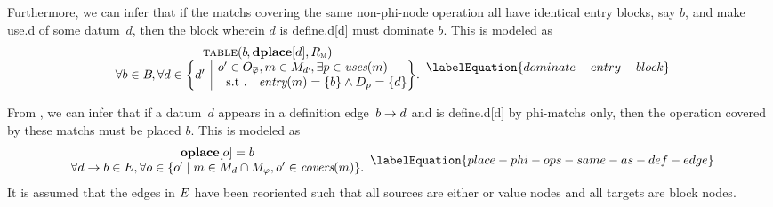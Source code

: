 Furthermore, we can infer that if the \glspl{match} covering the same
non-\gls{phi-node} \gls{operation} all have identical \glspl{entry block}, say
$b$\hspace{-1pt}, and make \gls{use.d} of some \gls{datum}~$d$\hspace{-1pt},
then the \gls{block} wherein $d$ is \gls{define.d}[d] must dominate
$b$\hspace{-1pt}.
%
This is modeled as
%
\begin{equation}
  \begin{array}{c}
    \mTable(b \hspace{-.8pt}, \mVar{dplace}[d], \mDomMatrix) \\
    \forall b \in \mBlockSet \hspace{-1pt},
    \forall d \in
      \mSetBuilder*{d'}%
                   {%
                     \begin{array}{@{}l@{}}
                       o' \in \mOpCompSet{\mPhi},
                       m \in \mMatchSet[d'] \hspace{-1pt},
                       \exists p \in \mUses(m) \\
                       \text{ \st}
                       \mEntry(m) = \mSet{b} \mAnd \mDataSet[p] = \mSet{d}
                     \end{array}
                   } \!.
  \end{array}
  \labelEquation{dominate-entry-block}
\end{equation}

From , we can infer that if a \gls{datum}~$d$ appears in
a \gls{definition edge}~$b \rightarrow d$ and is \gls{define.d}[d] by
\glspl{phi-match} only, then the \gls{operation} covered by these \glspl{match}
must be placed $b$.
%
This is modeled as
%
\begin{equation}
  \begin{array}{c}
    \mVar{oplace}[o] = b \\
    \forall \mEdge{d}{b} \in \mFunctionDefEdgeSet,
    \forall o \in
      \mSetBuilder{o'}%
                  {%
                    \begin{array}{@{}l@{}}
                      m \in \mMatchSet[d] \cap \mPhiMatchSet,
                      o' \in \mCovers(m)
                    \end{array}
                  }.
  \end{array}
  \labelEquation{place-phi-ops-same-as-def-edge}
\end{equation}
%
It is assumed that the \glspl{edge} in $E$ have been
reoriented such that all \glspl{source} are either  or
\glspl{value node} and all \glspl{target} are \glspl{block node}.


